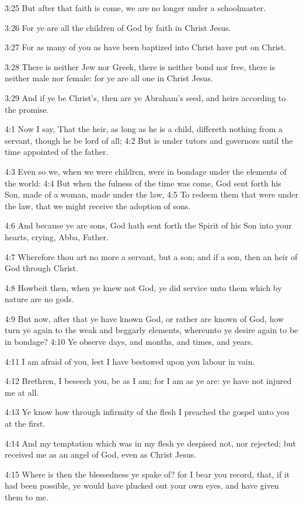 3:25 But after that faith is come, we are no longer under a
schoolmaster.

3:26 For ye are all the children of God by faith in Christ Jesus.

3:27 For as many of you as have been baptized into Christ have put on
Christ.

3:28 There is neither Jew nor Greek, there is neither bond nor free,
there is neither male nor female: for ye are all one in Christ Jesus.

3:29 And if ye be Christ's, then are ye Abraham's seed, and heirs
according to the promise.

4:1 Now I say, That the heir, as long as he is a child, differeth
nothing from a servant, though he be lord of all; 4:2 But is under
tutors and governors until the time appointed of the father.

4:3 Even so we, when we were children, were in bondage under the
elements of the world: 4:4 But when the fulness of the time was come,
God sent forth his Son, made of a woman, made under the law, 4:5 To
redeem them that were under the law, that we might receive the
adoption of sons.

4:6 And because ye are sons, God hath sent forth the Spirit of his Son
into your hearts, crying, Abba, Father.

4:7 Wherefore thou art no more a servant, but a son; and if a son,
then an heir of God through Christ.

4:8 Howbeit then, when ye knew not God, ye did service unto them which
by nature are no gods.

4:9 But now, after that ye have known God, or rather are known of God,
how turn ye again to the weak and beggarly elements, whereunto ye
desire again to be in bondage?  4:10 Ye observe days, and months, and
times, and years.

4:11 I am afraid of you, lest I have bestowed upon you labour in vain.

4:12 Brethren, I beseech you, be as I am; for I am as ye are: ye have
not injured me at all.

4:13 Ye know how through infirmity of the flesh I preached the gospel
unto you at the first.

4:14 And my temptation which was in my flesh ye despised not, nor
rejected; but received me as an angel of God, even as Christ Jesus.

4:15 Where is then the blessedness ye spake of? for I bear you record,
that, if it had been possible, ye would have plucked out your own
eyes, and have given them to me.

